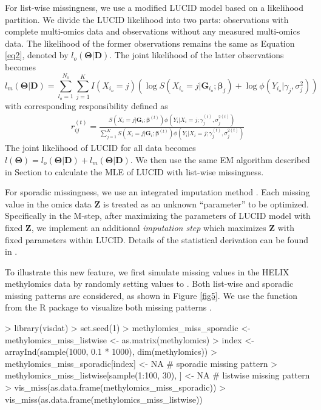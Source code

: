 For list-wise missingness, we use a modified LUCID model based on a likelihood partition. We divide the LUCID likelihood into two parts: observations with complete multi-omics data and observations without any measured multi-omics data. The likelihood of the former observations remains the same as Equation \ref{eq2}, denoted by $l_o (\bm{\Theta}|\bm{D})$. The joint likelihood of the latter observations becomes
\begin{equation}
    l_m(\bm{\Theta}|\bm{D}) = \sum_{l_o=1}^{N_o}\sum_{j=1}^K I(X_{i_o} = j) \left( \log S(X_{i_o} = j| \bm{G}_{i_o};\bm{\beta}_j) + \log \phi\left(Y_{i_o}|\gamma_j, \sigma_j^2\right)\right)
    \label{eq22}
\end{equation}
with corresponding responsibility defined as 
\begin{equation}
    \begin{aligned}
        r_{ij}^{(t)} = \frac{S\left(X_i = j| \bm{G}_i; \bm{\beta}^{(t)}\right) \phi\left(Y_i|X_i = j; \gamma_j^{(t)}, \sigma^{2(t)}_j \right)}{\sum_{j = 1}^K S\left(X_i = j| \bm{G}_i; \bm{\beta}^{(t)}\right) \phi \left(Y_i|X_i = j; \gamma_j^{(t)}, \sigma^{2(t)}_j\right)}
    \end{aligned}
    \label{eq23}
\end{equation}
The joint likelihood of LUCID for all data becomes $l(\bm{\Theta}) = l_o (\bm{\Theta}|\bm{D}) +l_m (\bm{\Theta}|\bm{D})$. We then use the same EM algorithm described in Section  to calculate the MLE of LUCID with list-wise missingness.

For sporadic missingness, we use an integrated imputation method \citep{zhang2021gaussian}. Each missing value in the omics data $\bm Z$ is treated as an unknown ``parameter'' to be optimized. Specifically in the M-step, after maximizing the parameters of LUCID model with fixed $\bm Z$, we implement an additional \emph{imputation step} which maximizes $\bm Z$ with fixed parameters within LUCID. Details of the statistical derivation can be found in \citet{zhang2021gaussian}.

To illustrate this new feature, we first simulate missing values in the HELIX methylomics data by randomly setting values to . Both list-wise and sporadic missing patterns are considered, as shown in Figure \ref{fig5}. We use the  function from the R package  to visualize both missing patterns \citep{visdat}. 
\begin{example}
> library(visdat)
> set.seed(1)
> methylomics_miss_sporadic <- methylomics_miss_listwise <- as.matrix(methylomics)
> index <- arrayInd(sample(1000, 0.1 * 1000), dim(methylomics))
> methylomics_miss_sporadic[index] <- NA # sporadic missing pattern
> methylomics_miss_listwise[sample(1:100, 30), ] <- NA # listwise missing pattern
> vis_miss(as.data.frame(methylomics_miss_sporadic))
> vis_miss(as.data.frame(methylomics_miss_listwise))
\end{example}

